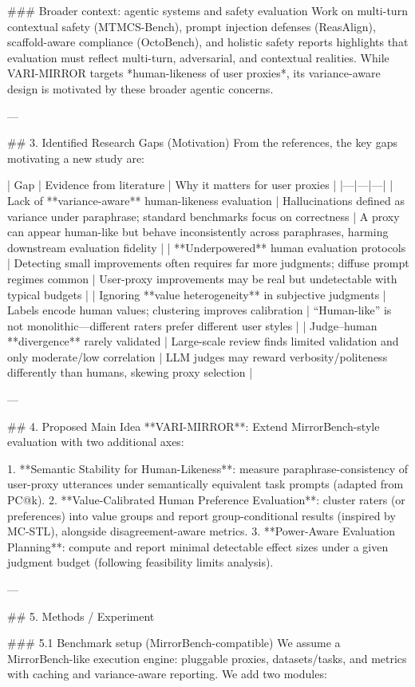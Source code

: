 ### Broader context: agentic systems and safety evaluation  
Work on multi-turn contextual safety (MTMCS-Bench), prompt injection defenses (ReasAlign), scaffold-aware compliance (OctoBench), and holistic safety reports highlights that evaluation must reflect multi-turn, adversarial, and contextual realities. While VARI-MIRROR targets *human-likeness of user proxies*, its variance-aware design is motivated by these broader agentic concerns.

---

## 3. Identified Research Gaps (Motivation)  
From the references, the key gaps motivating a new study are:

| Gap | Evidence from literature | Why it matters for user proxies |
|---|---|---|
| Lack of **variance-aware** human-likeness evaluation | Hallucinations defined as variance under paraphrase; standard benchmarks focus on correctness | A proxy can appear human-like but behave inconsistently across paraphrases, harming downstream evaluation fidelity |
| **Underpowered** human evaluation protocols | Detecting small improvements often requires far more judgments; diffuse prompt regimes common | User-proxy improvements may be real but undetectable with typical budgets |
| Ignoring **value heterogeneity** in subjective judgments | Labels encode human values; clustering improves calibration | “Human-like” is not monolithic—different raters prefer different user styles |
| Judge–human **divergence** rarely validated | Large-scale review finds limited validation and only moderate/low correlation | LLM judges may reward verbosity/politeness differently than humans, skewing proxy selection |

---

## 4. Proposed Main Idea  
**VARI-MIRROR**: Extend MirrorBench-style evaluation with two additional axes:

1. **Semantic Stability for Human-Likeness**: measure paraphrase-consistency of user-proxy utterances under semantically equivalent task prompts (adapted from PC@k).  
2. **Value-Calibrated Human Preference Evaluation**: cluster raters (or preferences) into value groups and report group-conditional results (inspired by MC-STL), alongside disagreement-aware metrics.  
3. **Power-Aware Evaluation Planning**: compute and report minimal detectable effect sizes under a given judgment budget (following feasibility limits analysis).

---

## 5. Methods / Experiment  

### 5.1 Benchmark setup (MirrorBench-compatible)  
We assume a MirrorBench-like execution engine: pluggable proxies, datasets/tasks, and metrics with caching and variance-aware reporting. We add two modules:


